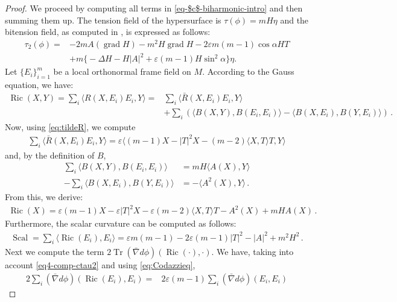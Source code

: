 \documentclass[11pt,leqno]{amsart}
\theoremstyle{plain}
\theoremstyle{definition}
\numberwithin{equation}{section}
\newcommand{\Ric}{\operatorname{Ric}}
\newcommand{\Scal}{\operatorname{Scal}}
\DeclareMathOperator{\grad}{grad}
\DeclareMathOperator{\trace}{Tr}
\numberwithin{equation}{section}
\begin{document}
{\begin{proof}We proceed by computing all terms in \eqref{eq-$c$-biharmonic-intro} and then summing them up.
The tension field of the hypersurface is $\tau(\phi)=m H \eta$ and the bitension field, as computed in \cite{MR4333889}, is expressed as follows:
\begin{align}\label{eq0-comp-ctau2}
\tau_2(\phi)=&-2m A(\grad H)-m^2 H \grad H - 2 \varepsilon m (m-1) \cos\alpha H T\nonumber\\
&+ m \big\{-\Delta H-  H |A|^2 + \varepsilon  (m-1) H \sin^2\alpha\big\}\eta.
\end{align}
Let $\{E_i\}_{i=1}^m$ be a local orthonormal frame field on $M$. According to the Gauss equation, we have:
\begin{align}\label{eq1-comp-ctau2}
\Ric(X,Y)=\sum_i \langle R(X,E_i)E_i,Y\rangle =& \sum_i \langle \bar R(X,E_i)E_i,Y\rangle\nonumber \\
&+\sum_i \left( \langle B(X,Y),B(E_i,E_i)\rangle-\langle B(X,E_i),B(Y,E_i)\rangle\right)\,.
\end{align}
Now, using \eqref{eq:tildeR}, we compute 
\begin{align}\label{eq2-comp-ctau2}
\sum_i \langle \bar R(X,E_i)E_i,Y\rangle= \varepsilon\langle (m-1)X-|T|^2 X-(m-2)\langle X,T \rangle T,Y\rangle
\end{align}
and, by the definition of $B$,
\begin{align}\label{eq3-comp-ctau2}
\sum_i \langle B(X,Y),B(E_i,E_i)\rangle&= m H\langle  A(X),Y \rangle \\
-\sum_i \langle  B(X,E_i),B(Y,E_i)\rangle&=- \langle A^2(X),Y \rangle\,.
\end{align}
From this, we derive:
\begin{align}\label{eq4-comp-ctau2}
\Ric(X)=\varepsilon(m-1)X-\varepsilon|T|^2 X-\varepsilon(m-2) \langle X,T \rangle T-A^2(X)+mHA(X) \,.
\end{align}
Furthermore, the scalar curvature can be computed as follows:
\begin{align}\label{eq5-comp-ctau2}
\Scal=\sum_i \langle \Ric(E_i), E_i\rangle=\varepsilon m(m-1)-2\varepsilon(m-1) |T|^2 -|A|^2+m^2H^2\,.
\end{align}
Next we compute the term $2\trace(\bar \nabla d\phi)(\Ric(\cdot),\cdot)$. 
We have, taking into account \eqref{eq4-comp-ctau2} and using \eqref{eq:Codazzieq},
\begin{align}\label{eq6-comp-ctau2}
 2\sum_i(\bar \nabla d\phi)(\Ric(E_i),E_i)=&2 \varepsilon (m-1) \sum_i(\bar \nabla d\phi)(E_i,E_i)

\end{align}
\end{proof}}
\end{document}
